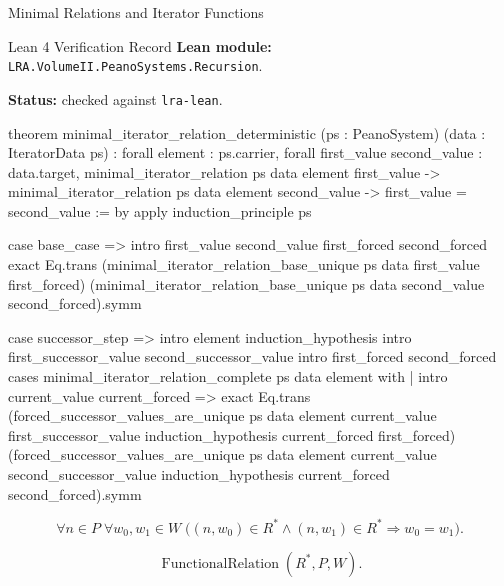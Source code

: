 \begin{topicbox}{Minimal Relations and Iterator Functions}
\begin{formalizationrecord}{Lean 4 Verification Record}
\textbf{Lean module:} \texttt{LRA.VolumeII.PeanoSystems.Recursion}.\par
{}
\textbf{Status:} checked against \texttt{lra-lean}.\par

\begin{leancode}
theorem minimal_iterator_relation_deterministic
    (ps : PeanoSystem)
    (data : IteratorData ps) :
    forall element : ps.carrier,
      forall first_value second_value : data.target,
        minimal_iterator_relation ps data element first_value ->
        minimal_iterator_relation ps data element second_value ->
        first_value = second_value := by
  apply induction_principle ps

  case base_case =>
    intro first_value second_value first_forced second_forced
    exact
      Eq.trans
        (minimal_iterator_relation_base_unique ps data first_value first_forced)
        (minimal_iterator_relation_base_unique ps data second_value second_forced).symm

  case successor_step =>
    intro element induction_hypothesis
    intro first_successor_value second_successor_value
    intro first_forced second_forced
    cases minimal_iterator_relation_complete ps data element with
    | intro current_value current_forced =>
        exact
          Eq.trans
            (forced_successor_values_are_unique
              ps data element current_value first_successor_value
              induction_hypothesis current_forced first_forced)
            (forced_successor_values_are_unique
              ps data element current_value second_successor_value
              induction_hypothesis current_forced second_forced).symm
\end{leancode}
\end{formalizationrecord}

\begin{remark*}
\[
\forall n\in P\;\forall w_0,w_1\in W\;
\bigl((n,w_0)\in R^*\land (n,w_1)\in R^*\Longrightarrow w_0=w_1\bigr).
\]
\end{remark*}

\begin{remark*}
\[
\operatorname{FunctionalRelation}(R^*,P,W).
\]
\end{remark*}


\end{topicbox}
